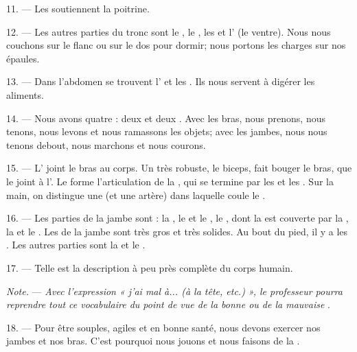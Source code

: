 11. --- Les  soutiennent la poitrine.

12. --- Les autres parties du tronc sont le , le ,
les  et l' (le ventre). Nous nous couchons sur
le flanc ou sur le dos pour dormir; nous portons les charges sur nos épaules.

13. --- Dans l'abdomen se trouvent l' et les
. Ils nous servent à digérer les aliments.

\VUsaut{4.4mm}
\VUsaut{3.0mm}

14. --- Nous avons quatre  : deux  et deux
. Avec les bras, nous prenons, nous tenons, nous levons et nous
ramassons les objets; avec les jambes, nous nous tenons debout, nous marchons
et nous courons.

15. --- L' joint le bras au corps. Un  très
robuste, le biceps, fait bouger le bras, que le  joint à
l'. Le  forme l'articulation de la
, qui se termine par les  et les .
Sur la main, on distingue une  (et une artère) dans laquelle
coule le .

16. --- Les parties de la jambe sont : la , le 
et le , le , dont la  est couverte
par la , la  et le . Les
 de la jambe sont très gros et très solides. Au bout du pied, il y a
les . Les autres parties sont la  et le
.

17. --- Telle est la description à peu près complète du corps humain.

\textit{Note.} --- \textit{Avec l'expression « j'ai mal à... (à la tête, etc.)
», le professeur pourra reprendre tout ce vocabulaire du point de vue de la
bonne ou de la mauvaise} .

\VUsaut{5.0mm}
\VUsaut{2.4mm}
\VUsaut{3.0mm}

18. --- Pour être souples, agiles et en bonne santé, nous devons exercer nos
jambes et nos bras. C'est pourquoi nous jouons et nous faisons de la
.


